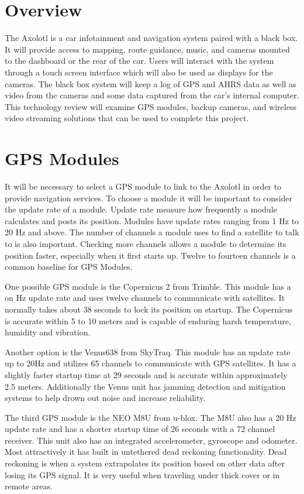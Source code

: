 \documentclass[onecolumn, draftclsnofoot,10pt, compsoc]{IEEEtran}
\begin{document}
\section{Overview}
The Axolotl is a car infotainment and navigation system paired with a black box.
It will provide access to mapping, route guidance, music, and cameras mounted
to the dashboard or the rear of the car. Users will interact with the system
through a touch screen interface which will also be used as displays for the
cameras. The black box system will keep a log of GPS and AHRS data as well as
video from the cameras and some data captured from the car's internal computer.
This technology review will examine GPS modules, backup cameras, and wireless
video streaming solutions that can be used to complete this project.

\section{GPS Modules}
It will be necessary to select a GPS module to link to the Axolotl in order
to provide navigation services. To choose a module it will be important to
consider the update rate of a module. Update rate measure how frequently a
module calculates and posts its position. Modules have update rates ranging
from 1 Hz to 20 Hz and above. The number of channels a module uses to find a
satellite to talk to is also important. Checking more channels allows a module
to determine its position faster, especially when it first starts up. Twelve to
fourteen channels is a common baseline for GPS Modules.

One possible GPS module is the Copernicus 2 from Trimble. This module has a on
Hz update rate and uses twelve channels to communicate with satellites.
It normally takes about 38 seconds to lock its position on startup. The
Copernicus is accurate within 5 to 10 meters and is capable of enduring harsh
temperature, humidity and vibration.

Another option is the Venus638 from SkyTraq. This module has an update rate up
to 20Hz and utilizes 65 channels to communicate with GPS satellites. It has a
slightly faster startup time at 29 seconds and is accurate within approximately
2.5 meters. Additionally the Venus unit has jamming detection and mitigation
systems to help drown out noise and increase reliability.

The third GPS module is the NEO M8U from u-blox. The M8U also has a 20 Hz update
rate and has a shorter startup time of 26 seconds with a 72 channel receiver.
This unit also has an integrated accelerometer, gyroscope and odometer. Most
attractively it has built in untethered dead reckoning functionality. Dead
reckoning is when a system extrapolates its position based on other data after
losing its GPS signal. It is very useful when traveling under thick cover or in
remote areas.
\end{document}
